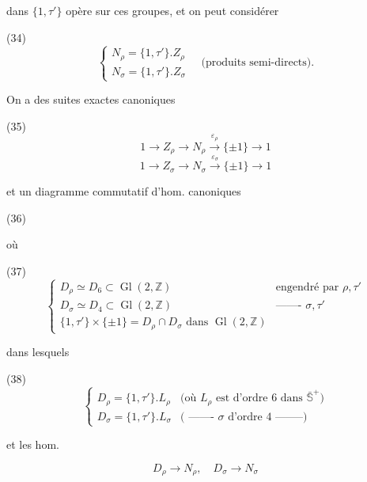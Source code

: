 \begin{enumerate}
\newpage



\newpage


dans $\{1,\tau'\}$ opère sur ces groupes, et on
peut considérer

(34)
$$
\begin{cases}
N_\rho = \{1,\tau'\}. Z_\rho \\
N_\sigma = \{1,\tau'\}. Z_\sigma
\end{cases} \quad \text{(produits semi-directs).}
$$

On a des suites exactes canoniques

(35)
$$1 \to Z_\rho \to N_\rho \xrightarrow{\varepsilon_\rho} \{\pm 1\} \to 1$$
$$1 \to Z_\sigma \to N_\sigma \xrightarrow{\varepsilon_\sigma} \{\pm 1\} \to 1$$

et un diagramme commutatif d'hom.
canoniques

(36)

où

(37)
$$
\begin{cases}
D_\rho \simeq D_6 \subset \operatorname{Gl}(2, \mathbb{Z}) & \text{engendré par } \rho, \tau' \\
D_\sigma \simeq D_4 \subset \operatorname{Gl}(2, \mathbb{Z}) & \text{------- } \sigma, \tau' \\
\{1,\tau'\} \times \{\pm 1\} = D_\rho \cap D_\sigma \text{ dans } \operatorname{Gl}(2, \mathbb{Z})
\end{cases}
$$

dans lesquels

(38)
$$
\begin{cases}
D_\rho = \{1,\tau'\}.L_\rho & \text{(où } L_\rho \text{ est d'ordre } 6 \text{ dans } \bar{\mathbb{S}}^+ \text{)} \\
D_\sigma = \{1,\tau'\}.L_\sigma & \text{( ------- } \sigma \text{ d'ordre } 4 \text{ --------)}
\end{cases}
$$

et les hom.

$$D_\rho \to N_\rho, \quad D_\sigma \to N_\sigma$$


\end{enumerate}
